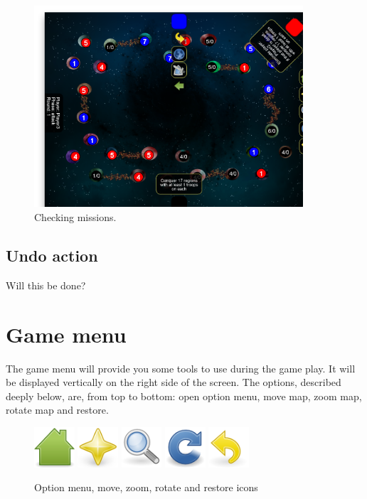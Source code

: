 \documentclass[12pt,a4paper]{article}
\begin{document}
\begin{figure}[h!]
\centering
\includegraphics[width=10cm]{pic/screenshot13.png}
\caption{Checking missions.}
\label{fig:checkmis}
\end{figure}

\subsection{Undo action}
\begin{todo}[Alberto]
Will this be done?
\end{todo}

\section{Game menu}
The game menu will provide you some tools to use during the game play. It will be displayed vertically on the right side of the screen. The options, described deeply below, are, from top to bottom: open option menu, move map, zoom map, rotate map and restore.

\begin{figure}[h!]
\centering
\includegraphics[width=1.5cm]{pic/home.png}
\includegraphics[width=1.5cm]{pic/move.png}
\includegraphics[width=1.5cm]{pic/zoom.png}
\includegraphics[width=1.5cm]{pic/rotate.png}
\includegraphics[width=1.5cm]{pic/undo.png}
\caption{Option menu, move, zoom, rotate and restore icons}
\label{fig:mapmenu}
\end{figure}
\end{document}
